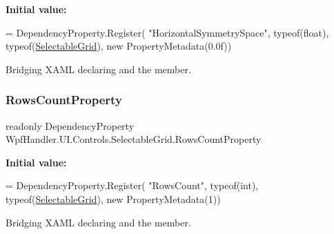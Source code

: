 {\bfseries Initial value\+:}
\begin{DoxyCode}
= DependencyProperty.Register(
            \textcolor{stringliteral}{"HorizontalSymmetrySpace"}, typeof(\textcolor{keywordtype}{float}), typeof(\mbox{\hyperlink{class_wpf_handler_1_1_u_i_1_1_controls_1_1_selectable_grid_a3968411e99848235dfb6bdb7ec0f8fc5}{SelectableGrid}}), \textcolor{keyword}{new} 
      PropertyMetadata(0.0f))
\end{DoxyCode}


Bridging X\+A\+ML declaring and the member. 

\mbox{\label{class_wpf_handler_1_1_u_i_1_1_controls_1_1_selectable_grid_a3745830392e0dc3a51702709acc6d2f3}} 
\subsubsection{\texorpdfstring{Rows\+Count\+Property}{RowsCountProperty}}
{\footnotesize\ttfamily readonly Dependency\+Property Wpf\+Handler.\+U\+I.\+Controls.\+Selectable\+Grid.\+Rows\+Count\+Property\hspace{0.3cm}{\ttfamily [static]}}

{\bfseries Initial value\+:}
\begin{DoxyCode}
= DependencyProperty.Register(
          \textcolor{stringliteral}{"RowsCount"}, typeof(\textcolor{keywordtype}{int}), typeof(\mbox{\hyperlink{class_wpf_handler_1_1_u_i_1_1_controls_1_1_selectable_grid_a3968411e99848235dfb6bdb7ec0f8fc5}{SelectableGrid}}), \textcolor{keyword}{new} PropertyMetadata(1))
\end{DoxyCode}


Bridging X\+A\+ML declaring and the member. 

\mbox{\label{class_wpf_handler_1_1_u_i_1_1_controls_1_1_selectable_grid_ad500e6d2835a39f0b2b3d7e617d41c3c}} 
